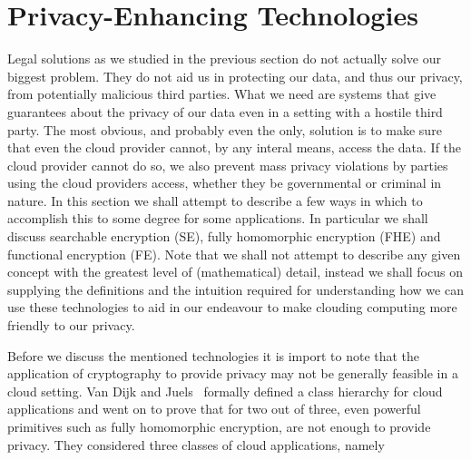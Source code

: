 \documentclass[11pt, a4paper]{article}
\begin{document}



\section{Privacy-Enhancing Technologies}
\label{sec:pet}

Legal solutions as we studied in the previous section do not actually solve our biggest problem. 
They do not aid us in protecting our data, and thus our privacy, from potentially malicious third parties. 
What we need are systems that give guarantees about the privacy of our data even in a setting with a hostile third party. 
The most obvious, and probably even the only, solution is to make sure that even the cloud provider cannot, by any interal means, access the data. 
If the cloud provider cannot do so, we also prevent mass privacy violations by parties using the cloud providers access, whether they be governmental or criminal in nature. 
In this section we shall attempt to describe a few ways in which to accomplish this to some degree for some applications. 
In particular we shall discuss searchable encryption (SE), fully homomorphic encryption (FHE) and functional encryption (FE).
Note that we shall not attempt to describe any given concept with the greatest level of (mathematical) detail, instead we shall focus on supplying the definitions and the intuition required for understanding how we can use these technologies to aid in our endeavour to make clouding computing more friendly to our privacy.

Before we discuss the mentioned technologies it is import to note that the application of cryptography to provide privacy may not be generally feasible in a cloud setting. 
Van Dijk and Juels~\cite{van2010impossibility} formally defined a class hierarchy for cloud applications and went on to prove that for two out of three, even powerful primitives such as fully homomorphic encryption, are not enough to provide privacy. 
They considered three classes of cloud applications, namely
\end{document}
